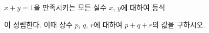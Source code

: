 $x+y=1$을 만족시키는 모든 실수 $x$, $y$에 대하여 등식\par\smallskip{}\par\smallskip\noindent 이 성립한다. 이때 상수 $p$, $q$, $r$에 대하여 $p+q+r$의 값을 구하시오.
